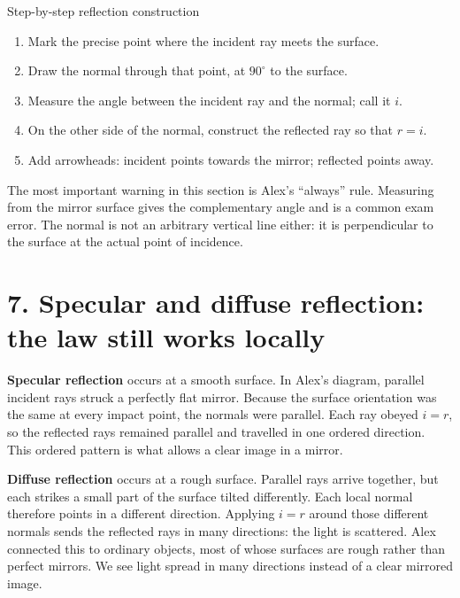 \documentclass[11pt,a4paper]{article}
\begin{document}
\begin{keybox}{Step-by-step reflection construction}
\begin{enumerate}
\item Mark the precise point where the incident ray meets the surface.
\item Draw the normal through that point, at $90^\circ$ to the surface.
\item Measure the angle between the incident ray and the normal; call it $i$.
\item On the other side of the normal, construct the reflected ray so that $r=i$.
\item Add arrowheads: incident points towards the mirror; reflected points away.
\end{enumerate}
\end{keybox}

\begin{mistakebox}
The most important warning in this section is Alex's ``always'' rule. Measuring from the mirror surface gives the complementary angle and is a common exam error. The normal is not an arbitrary vertical line either: it is perpendicular to the surface at the actual point of incidence.
\end{mistakebox}

\section*{7. Specular and diffuse reflection: the law still works locally}
\textbf{Specular reflection} occurs at a smooth surface. In Alex's diagram, parallel incident rays struck a perfectly flat mirror. Because the surface orientation was the same at every impact point, the normals were parallel. Each ray obeyed $i=r$, so the reflected rays remained parallel and travelled in one ordered direction. This ordered pattern is what allows a clear image in a mirror.

\textbf{Diffuse reflection} occurs at a rough surface. Parallel rays arrive together, but each strikes a small part of the surface tilted differently. Each local normal therefore points in a different direction. Applying $i=r$ around those different normals sends the reflected rays in many directions: the light is scattered. Alex connected this to ordinary objects, most of whose surfaces are rough rather than perfect mirrors. We see light spread in many directions instead of a clear mirrored image.
\end{document}
